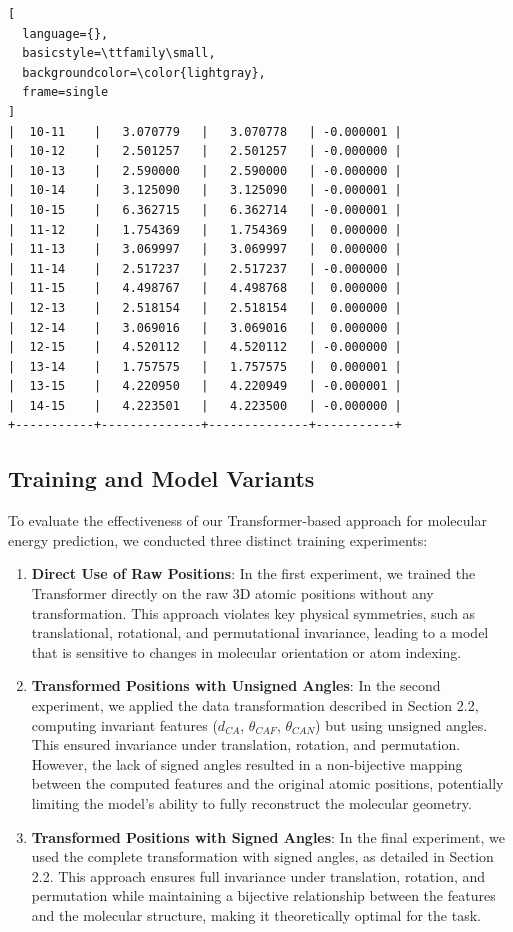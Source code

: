 \documentclass{article}
\begin{document}
\begin{lstlisting}[
  language={},
  basicstyle=\ttfamily\small,
  backgroundcolor=\color{lightgray},
  frame=single
]
|  10-11    |   3.070779   |   3.070778   | -0.000001 |
|  10-12    |   2.501257   |   2.501257   | -0.000000 |
|  10-13    |   2.590000   |   2.590000   | -0.000000 |
|  10-14    |   3.125090   |   3.125090   | -0.000001 |
|  10-15    |   6.362715   |   6.362714   | -0.000001 |
|  11-12    |   1.754369   |   1.754369   |  0.000000 |
|  11-13    |   3.069997   |   3.069997   |  0.000000 |
|  11-14    |   2.517237   |   2.517237   | -0.000000 |
|  11-15    |   4.498767   |   4.498768   |  0.000000 |
|  12-13    |   2.518154   |   2.518154   |  0.000000 |
|  12-14    |   3.069016   |   3.069016   |  0.000000 |
|  12-15    |   4.520112   |   4.520112   | -0.000000 |
|  13-14    |   1.757575   |   1.757575   |  0.000001 |
|  13-15    |   4.220950   |   4.220949   | -0.000001 |
|  14-15    |   4.223501   |   4.223500   | -0.000000 |
+-----------+--------------+--------------+-----------+
\end{lstlisting}


\subsection{Training and Model Variants}

To evaluate the effectiveness of our Transformer-based approach for molecular energy prediction, we conducted three distinct training experiments:

\begin{enumerate}
    \item \textbf{Direct Use of Raw Positions}: In the first experiment, we trained the Transformer directly on the raw 3D atomic positions without any transformation. This approach violates key physical symmetries, such as translational, rotational, and permutational invariance, leading to a model that is sensitive to changes in molecular orientation or atom indexing.
    \item \textbf{Transformed Positions with Unsigned Angles}: In the second experiment, we applied the data transformation described in Section 2.2, computing invariant features (\( d_{CA} \), \( \theta_{CAF} \), \( \theta_{CAN} \)) but using unsigned angles. This ensured invariance under translation, rotation, and permutation. However, the lack of signed angles resulted in a non-bijective mapping between the computed features and the original atomic positions, potentially limiting the model's ability to fully reconstruct the molecular geometry.
    \item \textbf{Transformed Positions with Signed Angles}: In the final experiment, we used the complete transformation with signed angles, as detailed in Section 2.2. This approach ensures full invariance under translation, rotation, and permutation while maintaining a bijective relationship between the features and the molecular structure, making it theoretically optimal for the task.
\end{enumerate}
\end{document}
